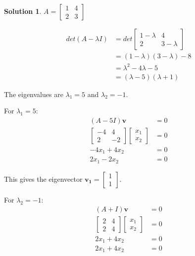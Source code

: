 \documentclass[11pt]{article}
\theoremstyle{definition}
\newtheorem*{solution}{Solution}
\begin{document}
\begin{solution}
    $A = \begin{bmatrix}
        1 & 4 \\
        2 & 3
    \end{bmatrix}$

    \begin{align}
        det(A - \lambda I) &= det\begin{bmatrix}
            1 - \lambda & 4 \\
            2 & 3 - \lambda
        \end{bmatrix} \\
        &= (1 - \lambda)(3 - \lambda) - 8 \\
        &= \lambda^2 - 4\lambda - 5 \\
        &= (\lambda - 5)(\lambda + 1)
    \end{align}

    The eigenvalues are $\lambda_1 = 5$ and $\lambda_2 = -1$.

    For $\lambda_1 = 5$:
    \begin{align}
        (A - 5I)\mathbf{v} &= 0 \\
        \begin{bmatrix}
            -4 & 4 \\
            2 & -2
        \end{bmatrix} \begin{bmatrix}
            x_1 \\ x_2
        \end{bmatrix} &= 0 \\
        -4x_1 + 4x_2 &= 0 \\
        2x_1 - 2x_2 &= 0
    \end{align}
    
    This gives the eigenvector $\mathbf{v_1} = \begin{bmatrix}
        1 \\ 1
    \end{bmatrix}$.

    For $\lambda_2 = -1$:
    \begin{align}
        (A + I)\mathbf{v} &= 0 \\
        \begin{bmatrix}
            2 & 4 \\
            2 & 4
        \end{bmatrix} \begin{bmatrix}
            x_1 \\ x_2
        \end{bmatrix} &= 0 \\
        2x_1 + 4x_2 &= 0 \\
        2x_1 + 4x_2 &= 0
    \end{align}


\end{solution}
\end{document}
